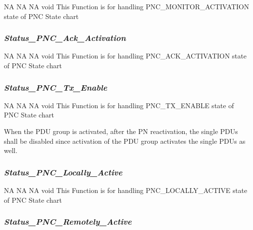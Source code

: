 
{NA}
{NA}
{NA}
{void}
{This Function is for handling PNC_MONITOR_ACTIVATION state of PNC State chart}

{ }

\subsubsection{\textit{Status_PNC_Ack_Activation}}

{NA}
{NA}
{NA}
{void}
{This Function is for handling PNC_ACK_ACTIVATION state of PNC State chart}	

{  }

\subsubsection{\textit{Status_PNC_Tx_Enable}}
\label{subsec:statuspnctxenable}

{NA}
{NA}
{NA}
{void}
{This Function is for handling PNC_TX_ENABLE state of PNC State chart}	

When the PDU group is activated, after the PN reactivation, 
the single PDUs shall be disabled since activation of the PDU group activates the single PDUs as well.   

{    }

\subsubsection{\textit{Status_PNC_Locally_Active}}

{NA}
{NA}
{NA}
{void}
{This Function is for handling PNC_LOCALLY_ACTIVE state of PNC State chart}

{ }

\subsubsection{\textit{Status_PNC_Remotely_Active}}


